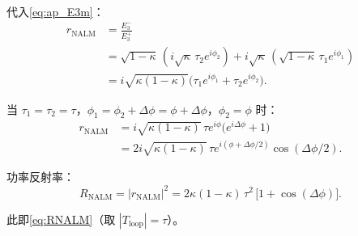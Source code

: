 \documentclass[11pt,a4paper]{ctexart}
\begin{document}
代入\cref{eq:ap_E3m}：
\begin{align}
  r_{\text{NALM}} &= \frac{E_3^-}{E_3^+} \\
  &= \sqrt{1-\kappa}\, (i\sqrt{\kappa}\, \tau_2 e^{i\phi_2})
     + i\sqrt{\kappa}\, (\sqrt{1-\kappa}\, \tau_1 e^{i\phi_1}) \\
  &= i\sqrt{\kappa(1-\kappa)}
     \bigl(\tau_1 e^{i\phi_1} + \tau_2 e^{i\phi_2}\bigr).
  \label{eq:ap_r_NALM_gen}
\end{align}

当 $\tau_1 = \tau_2 = \tau$，$\phi_1 = \phi_2 + \Delta\phi = \phi + \Delta\phi$，$\phi_2 = \phi$ 时：
\begin{align}
  r_{\text{NALM}} &= i\sqrt{\kappa(1-\kappa)} \,
     \tau e^{i\phi} \bigl(e^{i\Delta\phi} + 1\bigr) \\
  &= 2i\sqrt{\kappa(1-\kappa)} \,
     \tau e^{i(\phi + \Delta\phi/2)} \cos(\Delta\phi/2).
  \label{eq:ap_r_NALM_final}
\end{align}

功率反射率：
\begin{equation}
  R_{\text{NALM}} = |r_{\text{NALM}}|^2
  = 2\kappa(1-\kappa)\,\tau^2\,
    \bigl[1 + \cos(\Delta\phi)\bigr].
  \label{eq:ap_R_final}
\end{equation}

此即\cref{eq:RNALM}（取 $|T_{\text{loop}}| = \tau$）。

\end{document}
